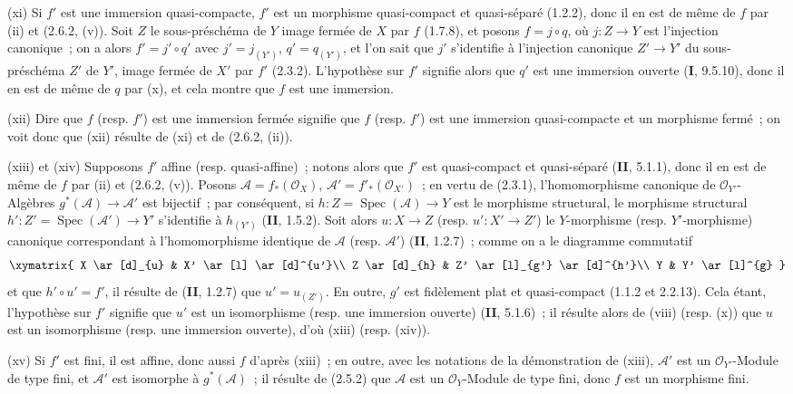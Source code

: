 (xi) Si $f'$ est une immersion quasi-compacte, $f'$ est un morphisme
quasi-compact et quasi-séparé (1.2.2), donc il en est de même de $f$ par (ii)
et (2.6.2, (v)). Soit $Z$ le sous-préschéma de $Y$ image fermée de $X$ par
$f$ (1.7.8), et posons $f=j\circ q$, où $j:Z\to Y$ est l'injection
canonique~; on a alors $f'=j'\circ q'$ avec $j'=j_{(Y')}$,
$q'=q_{(Y')}$, et l'on sait que $j'$ s'identifie à l'injection canonique
$Z'\to Y'$ du sous-préschéma $Z'$ de $Y'$, image fermée de $X'$ par $f'$
(2.3.2). L'hypothèse sur $f'$ signifie alors que $q'$ est une immersion
ouverte (\textbf{I}, 9.5.10), donc il en est de même de $q$ par (x), et cela montre
que $f$ est une immersion.

(xii) Dire que $f$ (resp. $f'$) est une immersion fermée signifie que
$f$ (resp. $f'$) est une immersion quasi-compacte et un morphisme fermé~; on
voit donc que (xii) résulte de (xi) et de (2.6.2, (ii)).

(xiii) et (xiv) Supposons $f'$ affine (resp. quasi-affine)~;
notons alors que $f'$ est quasi-compact et quasi-séparé (\textbf{II}, 5.1.1), donc il
en est de même de $f$ par (ii) et (2.6.2, (v)). Posons
$\mathcal A=f_*(\mathcal O_X)$, $\mathcal A'=f'_*(\mathcal O_{X'})$~; en
vertu de (2.3.1), l'homomorphisme canonique de $\mathcal O_{Y'}$-Algèbres
$g^*(\mathcal A)\to\mathcal A'$ est bijectif~; par conséquent, si
$h:Z=\operatorname{Spec}(\mathcal A)\to Y$ est le morphisme structural, le
morphisme structural $h':Z'=\operatorname{Spec}(\mathcal A')\to Y'$
s'identifie à $h_{(Y')}$ (\textbf{II}, 1.5.2). Soit alors $u:X\to Z$ (resp.
$u':X'\to Z'$) le $Y$-morphisme (resp. $Y'$-morphisme) canonique
correspondant à l'homomorphisme identique de $\mathcal A$ (resp.
$\mathcal A'$) (\textbf{II}, 1.2.7)~; comme on a le diagramme commutatif
\[
\xymatrix{
X \ar[d]_{u} & X' \ar[l] \ar[d]^{u'}\\
Z \ar[d]_{h} & Z' \ar[l]_{g'} \ar[d]^{h'}\\
Y & Y' \ar[l]^{g}
}
\]
et que $h'\circ u'=f'$, il résulte de (\textbf{II}, 1.2.7) que $u'=u_{(Z')}$. En
outre, $g'$ est fidèlement plat et quasi-compact (1.1.2 et 2.2.13). Cela
étant, l'hypothèse sur $f'$ signifie que $u'$ est un isomorphisme (resp. une
immersion ouverte) (\textbf{II}, 5.1.6)~; il résulte alors de (viii) (resp. (x)) que
$u$ est un isomorphisme (resp. une immersion ouverte), d'où (xiii) (resp.
(xiv)).

(xv) Si $f'$ est fini, il est affine, donc aussi $f$ d'après (xiii)~;
en outre, avec les notations de la démonstration de (xiii), $\mathcal A'$ est
un $\mathcal O_{Y'}$-Module de type fini, et $\mathcal A'$ est isomorphe à
$g^*(\mathcal A)$~; il résulte de (2.5.2) que $\mathcal A$ est un
$\mathcal O_Y$-Module de type fini, donc $f$ est un morphisme fini.

